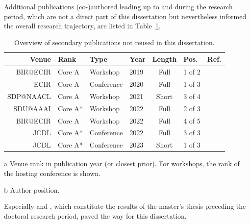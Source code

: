 Additional publications (co-)authored leading up to and during the research period, which are not a direct part of this dissertation but nevertheless informed the overall research trajectory, are listed in Table~\ref{tab:secondarypublicationoverview}.

\begin{table}[h]
  \caption{Overview of secondary publications not reused in this dissertation.}
  \label{tab:secondarypublicationoverview}
  \centering
  \begin{threeparttable}
  \begin{tabular}{rlllclr}
    \hline
    Venue & Rank\tnote{a} & Type      & Year & Length & Pos.\tnote{b} & Ref. \\
    \hline
    BIR@ECIR  & Core A  & Workshop    & 2019 & Full   & 1 of 2 & \cite{Saier2019} \\
    ECIR      & Core A  & Conference  & 2020 & Full   & 1 of 3 & \cite{Saier2020a} \\
    SDP@NAACL & Core A  & Workshop    & 2021 & Short  & 3 of 4 & \cite{Krause2021} \\
    SDU@AAAI  & Core A* & Workshop    & 2022 & Full   & 2 of 3 & \cite{Shapiro2022} \\
    BIR@ECIR  & Core A  & Workshop    & 2022 & Full   & 4 of 5 & \cite{Faerber2022bir} \\
    JCDL      & Core A* & Conference  & 2022 & Full   & 3 of 3 & \cite{Nishioka2022} \\
    JCDL      & Core A* & Conference  & 2023 & Short  & 1 of 3 & \cite{Saier2023cocon} \\
    \hline
    \end{tabular}
    \begin{tablenotes}
      \item[a] Venue rank in publication year (or closest prior). For workshops, the rank of the hosting conference is shown.
      \item[b] Author position.
    \end{tablenotes}
    \end{threeparttable}
\end{table}

Especially \cite{Saier2019} and \cite{Saier2020a}, which constitute the results of the master's thesis preceding the doctoral research period, paved the way for this dissertation.
